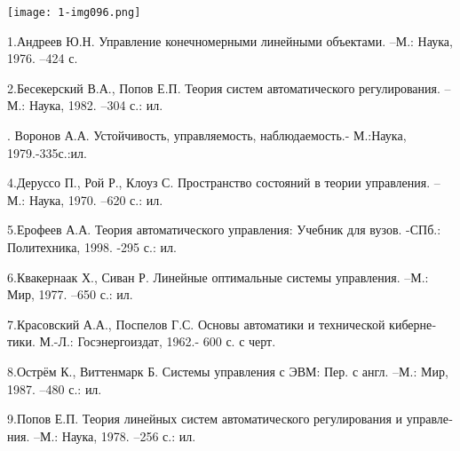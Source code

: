 \documentclass[a4paper]{article}
\begin{document}
{\centering  \texttt{[image: 1-img096.png]} \par}


\bigskip

{\begin{russian}\sffamily
1.Андреев Ю.Н. Управление конечномерными линейными объектами. –М.: Наука, 1976. –424 с. 
\end{russian}}

{\begin{russian}
\textsf{2.Бесекерский В.А., Попов Е.П. Теория систем автоматического регулирования. –М.: Наука, 1982. –304 с.: ил.}
\end{russian}}

{\begin{russian}. Воронов А.А. Устойчивость, управляемость, наблюдаемость.- М.:Наука, 1979.-335с.:ил.
\end{russian}}

{\begin{russian}
\textsf{4.Деруссо П., Рой Р., Клоуз С. Пространство состояний в теории управления. –М.: Наука, 1970. –620 с.: ил.}
\end{russian}}

{\begin{russian}\sffamily
5.Ерофеев А.А. Теория автоматического управления: Учебник для вузов. -СПб.: Политехника, 1998. -295 с.: ил. 
\end{russian}}

{\begin{russian}\sffamily
6.Квакернаак Х., Сиван Р. Линейные оптимальные системы управления. –М.: Мир, 1977. –650 с.: ил.
\end{russian}}

{\begin{russian}
\textsf{7.Красовский А.А., Поспелов Г.С. Основы автоматики и технической кибернетики. М.-Л.: Госэнергоиздат, 1962.- 600
с. с черт.}
\end{russian}}

{\begin{russian}\sffamily
8.Острём К., Виттенмарк Б. Системы управления с ЭВМ: Пер. с англ. –М.: Мир, 1987. –480 с.: ил.
\end{russian}}

{\begin{russian}\sffamily
9.Попов Е.П. Теория линейных систем автоматического регулирования и управления. –М.: Наука, 1978. –256 с.: ил.
\end{russian}}
\end{document}
